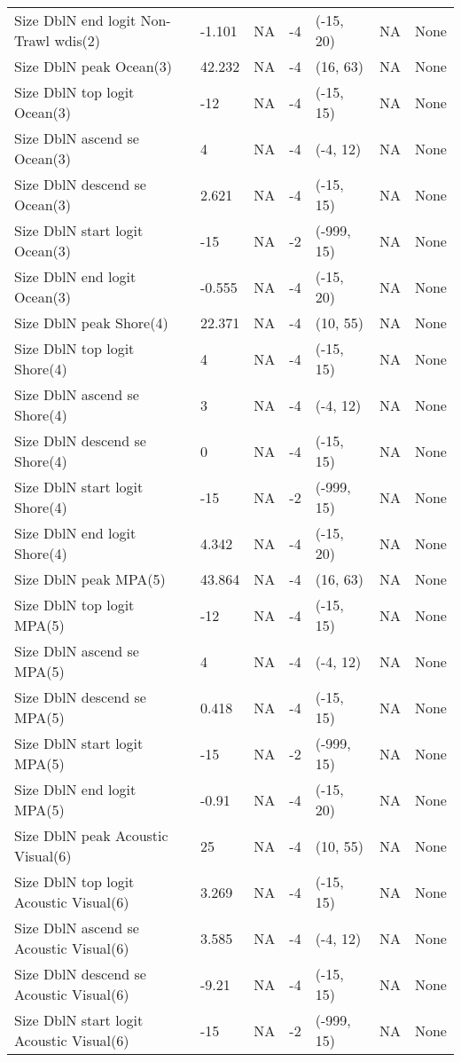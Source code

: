 \documentclass[11pt,
  letterpaper,
]{article}
\begin{document}
\begin{landscape}
\begin{longtable}[t]{>{\raggedright\arraybackslash}p{7.5cm}lllll>{\raggedright\arraybackslash}p{3.5cm}}
Size DblN end logit Non-Trawl wdis(2) & -1.101 & NA & -4 & (-15, 20) & NA & None\\
Size DblN peak Ocean(3) & 42.232 & NA & -4 & (16, 63) & NA & None\\
Size DblN top logit Ocean(3) & -12 & NA & -4 & (-15, 15) & NA & None\\
Size DblN ascend se Ocean(3) & 4 & NA & -4 & (-4, 12) & NA & None\\
Size DblN descend se Ocean(3) & 2.621 & NA & -4 & (-15, 15) & NA & None\\
Size DblN start logit Ocean(3) & -15 & NA & -2 & (-999, 15) & NA & None\\
Size DblN end logit Ocean(3) & -0.555 & NA & -4 & (-15, 20) & NA & None\\
Size DblN peak Shore(4) & 22.371 & NA & -4 & (10, 55) & NA & None\\
Size DblN top logit Shore(4) & 4 & NA & -4 & (-15, 15) & NA & None\\
Size DblN ascend se Shore(4) & 3 & NA & -4 & (-4, 12) & NA & None\\
Size DblN descend se Shore(4) & 0 & NA & -4 & (-15, 15) & NA & None\\
Size DblN start logit Shore(4) & -15 & NA & -2 & (-999, 15) & NA & None\\
Size DblN end logit Shore(4) & 4.342 & NA & -4 & (-15, 20) & NA & None\\
Size DblN peak MPA(5) & 43.864 & NA & -4 & (16, 63) & NA & None\\
Size DblN top logit MPA(5) & -12 & NA & -4 & (-15, 15) & NA & None\\
Size DblN ascend se MPA(5) & 4 & NA & -4 & (-4, 12) & NA & None\\
Size DblN descend se MPA(5) & 0.418 & NA & -4 & (-15, 15) & NA & None\\
Size DblN start logit MPA(5) & -15 & NA & -2 & (-999, 15) & NA & None\\
Size DblN end logit MPA(5) & -0.91 & NA & -4 & (-15, 20) & NA & None\\
Size DblN peak Acoustic Visual(6) & 25 & NA & -4 & (10, 55) & NA & None\\
Size DblN top logit Acoustic Visual(6) & 3.269 & NA & -4 & (-15, 15) & NA & None\\
Size DblN ascend se Acoustic Visual(6) & 3.585 & NA & -4 & (-4, 12) & NA & None\\
Size DblN descend se Acoustic Visual(6) & -9.21 & NA & -4 & (-15, 15) & NA & None\\
Size DblN start logit Acoustic Visual(6) & -15 & NA & -2 & (-999, 15) & NA & None\\

\end{longtable}
\end{landscape}
\end{document}
